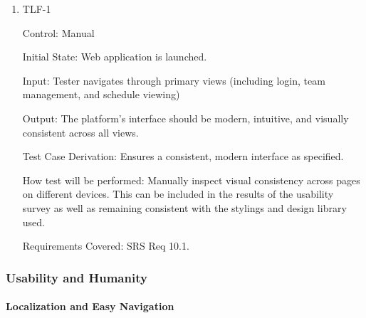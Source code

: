 \documentclass[12pt, titlepage]{article}
\begin{document}
\begin{enumerate}

    \item{TLF-1\\}

          Control: Manual

          Initial State: Web application is launched.

          Input: Tester navigates through primary views (including login, team management, and schedule viewing)

          Output: The platform’s interface should be modern, intuitive, and visually consistent across all views.

          Test Case Derivation: Ensures a consistent, modern interface as specified.

          How test will be performed: Manually inspect visual consistency across pages on different devices. This can be included in the results of the usability survey as well as remaining consistent with the stylings and design library used.

          Requirements Covered: SRS Req 10.1.

\end{enumerate}

\subsubsection{Usability and Humanity}

\paragraph{Localization and Easy Navigation}
\end{document}
